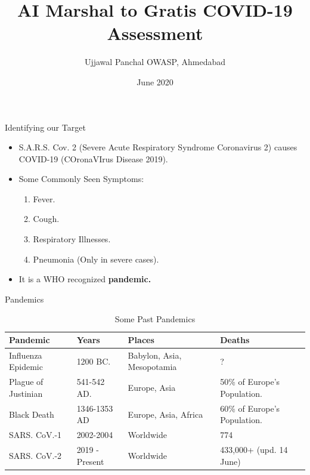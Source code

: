 \documentclass{beamer}
\title{AI Marshal to Gratis COVID-19 Assessment}
\author{Ujjawal Panchal\newline
OWASP, Ahmedabad}
\date{June 2020}
\begin{document}
      \maketitle
      
    \begin{frame}{Identifying our Target}
        \begin{itemize}
            \item S.A.R.S. Cov. 2 (Severe Acute Respiratory Syndrome Coronavirus 2) causes COVID-19 (COronaVIrus Disease 2019).
            \vspace{10mm}
            \item Some Commonly Seen Symptoms:
                \begin{enumerate}
                    \item Fever.
                    \item Cough.
                    \item Respiratory Illnesses.
                    \item Pneumonia (Only in severe cases).
                \end{enumerate}
            \vspace{10mm}
            \item It is a WHO recognized \textbf{pandemic.}
        \end{itemize}
    \end{frame}
    
    \begin{frame}{Pandemics}
    	\small{
	        \begin{table}[htbp]
	            \begin{tabular}{|p{3cm}|p{1cm}|p{2cm}|p{2cm}|}
	                \hline
	                 Pandemic & Years & Places  & Deaths\\
	                 \hline
	                 Influenza Epidemic & 1200 BC. & Babylon, Asia, Mesopotamia & ?\\
	                 \hline
	                 Plague of Justinian & 541-542 AD. &  Europe, Asia & 50\% of Europe's Population.\\
	                 \hline
	                 Black Death & 1346-1353 AD & Europe, 
	                 Asia, Africa & 60\% of Europe's Population.\\
	                 \hline
	                 SARS. CoV.-1 & 2002-2004 & Worldwide & 774\\
	                 \hline
	                 SARS. CoV.-2 & 2019 - Present &  Worldwide & 433,000+ (upd. 14 June)\\
	                 \hline
	            \end{tabular}
	            \caption{Some Past Pandemics}
	            \label{tab:my_label}
	        \end{table}
    	}
    \end{frame}
\end{document}
